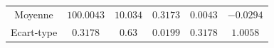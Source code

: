 \documentclass[10pt]{report}
\begin{document}
\begin{exercice}
\begin{enumerate}
\begin{center}
\begin{tabular}{c|ccccc}
    
        Moyenne
         & 
    
        $100.0043$
         & 
    
        $10.034$
         & 
    
        $0.3173$
         & 
    
        $0.0043$
         & 
    
        $-0.0294$
        
    \\ 

    
        Ecart-type
         & 
    
        $0.3178$
         & 
    
        $0.63$
         & 
    
        $0.0199$
         & 
    
        $0.3178$
         & 
    
        $1.0058$
        
    \\ 

    \end{tabular}
\end{center}


\end{enumerate}
\end{exercice}
\end{document}
